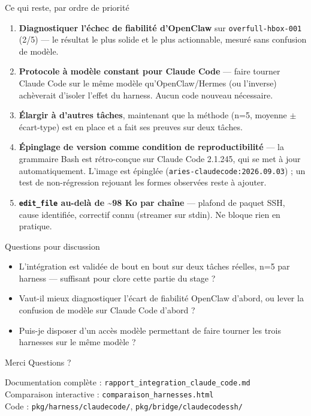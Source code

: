 \documentclass[aspectratio=169]{beamer}
\begin{document}
\begin{frame}{Ce qui reste, par ordre de priorité}
\begin{enumerate}
  \item \textbf{Diagnostiquer l'échec de fiabilité d'OpenClaw} sur
        \texttt{overfull-hbox-001} (2/5) --- le résultat le plus solide et le
        plus actionnable, mesuré sans confusion de modèle.
  \item \textbf{Protocole à modèle constant pour Claude Code} --- faire
        tourner Claude Code sur le même modèle qu'OpenClaw/Hermes (ou
        l'inverse) achèverait d'isoler l'effet du harness. Aucun code
        nouveau nécessaire.
  \item \textbf{Élargir à d'autres tâches}, maintenant que la méthode (n=5,
        moyenne $\pm$ écart-type) est en place et a fait ses preuves sur deux
        tâches.
  \item \textbf{Épinglage de version comme condition de reproductibilité} ---
        la grammaire Bash est rétro-conçue sur Claude Code 2.1.245, qui se met
        à jour automatiquement. L'image est épinglée
        (\texttt{aries-claudecode:2026.09.03}) ; un test de non-régression
        rejouant les formes observées reste à ajouter.
  \item \textbf{\texttt{edit\_file} au-delà de \textasciitilde98 Ko par
        chaîne} --- plafond de paquet SSH, cause identifiée, correctif connu
        (streamer sur stdin). Ne bloque rien en pratique.
\end{enumerate}
\end{frame}

\begin{frame}{Questions pour discussion}
\begin{itemize}
  \item L'intégration est validée de bout en bout sur deux tâches réelles,
        n=5 par harness --- suffisant pour clore cette partie du stage ?
  \item Vaut-il mieux diagnostiquer l'écart de fiabilité OpenClaw d'abord,
        ou lever la confusion de modèle sur Claude Code d'abord ?
  \item Puis-je disposer d'un accès modèle permettant de faire tourner les
        trois harnesses sur le même modèle ?
\end{itemize}
\end{frame}

\begin{frame}{Merci}
\centering
\Large Questions ?

\vspace{1cm}
\normalsize
Documentation complète : \texttt{rapport\_integration\_claude\_code.md} \\
Comparaison interactive : \texttt{comparaison\_harnesses.html} \\
Code : \texttt{pkg/harness/claudecode/}, \texttt{pkg/bridge/claudecodessh/}
\end{frame}
\end{document}
